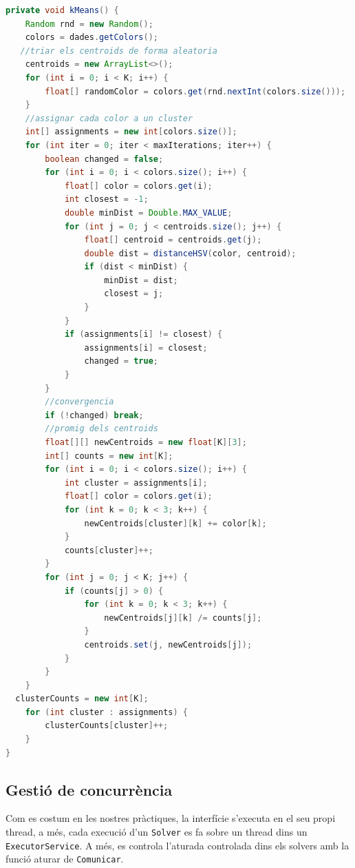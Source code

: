 \documentclass{ieeetj}
\begin{document}
\begin{lstlisting}[language = Java, breaklines = true]
private void kMeans() {
    Random rnd = new Random();
    colors = dades.getColors();
   //triar els centroids de forma aleatoria
    centroids = new ArrayList<>();
    for (int i = 0; i < K; i++) {
        float[] randomColor = colors.get(rnd.nextInt(colors.size()));            centroids.add(randomColor);
    }
    //assignar cada color a un cluster
    int[] assignments = new int[colors.size()];
    for (int iter = 0; iter < maxIterations; iter++) {
        boolean changed = false;
        for (int i = 0; i < colors.size(); i++) {
            float[] color = colors.get(i);
            int closest = -1;
            double minDist = Double.MAX_VALUE;
            for (int j = 0; j < centroids.size(); j++) {
                float[] centroid = centroids.get(j);
                double dist = distanceHSV(color, centroid);
                if (dist < minDist) {
                    minDist = dist;
                    closest = j;
                }
            }
            if (assignments[i] != closest) {
                assignments[i] = closest;
                changed = true;
            }
        }
        //convergencia
        if (!changed) break;
        //promig dels centroids
        float[][] newCentroids = new float[K][3];
        int[] counts = new int[K];
        for (int i = 0; i < colors.size(); i++) {
            int cluster = assignments[i];
            float[] color = colors.get(i);
            for (int k = 0; k < 3; k++) {
                newCentroids[cluster][k] += color[k];
            }
            counts[cluster]++;
        }
        for (int j = 0; j < K; j++) {
            if (counts[j] > 0) {
                for (int k = 0; k < 3; k++) {
                    newCentroids[j][k] /= counts[j];
                }
                centroids.set(j, newCentroids[j]);
            }
        }
    }
  clusterCounts = new int[K];
    for (int cluster : assignments) {
        clusterCounts[cluster]++;
    }
}

\end{lstlisting}
\subsection{Gestió de concurrència} 
Com es costum en les nostres pràctiques, la interfície s'executa en el seu propi thread, a més, cada execució d'un \texttt{Solver} es fa sobre un thread dins un \texttt{ExecutorService}.
A més, es controla l'aturada controlada dins els solvers amb la funció aturar de \texttt{Comunicar}.
\end{document}
